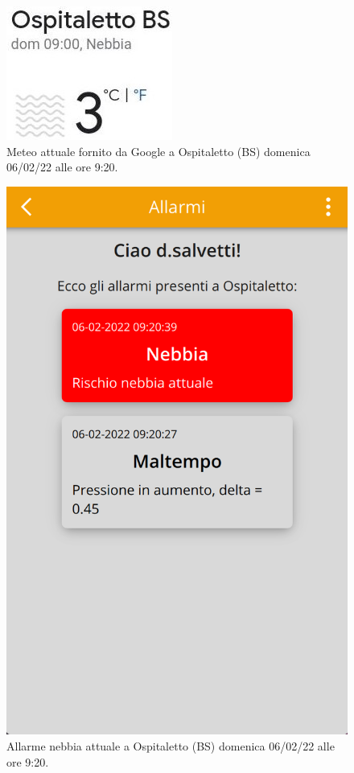 \UseRawInputEncoding


\begin{figure}[h!]
	\centering
	\includegraphics[width=0.2\linewidth]{./Iterazione 3/ImageFiles/Nebbia Ospitaletto Google}
	\caption{Meteo attuale fornito da Google a Ospitaletto (BS) domenica 06/02/22 alle ore 9:20.}
	\label{fig:test_previsione}
\end{figure}

\begin{figure}[h!]
	\centering
	\includegraphics[width=0.3\linewidth]{./Iterazione 3/ImageFiles/testAppRedFog}
	\caption{Allarme nebbia attuale a Ospitaletto (BS) domenica 06/02/22 alle ore 9:20.}
	\label{fig:test_previsione}
\end{figure}